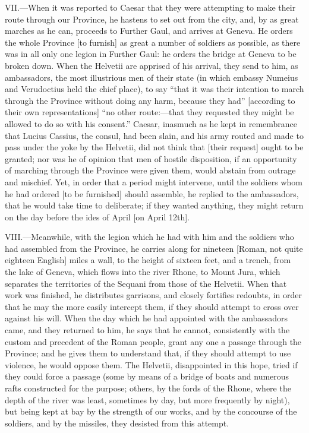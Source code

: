 VII.—When it was reported to Caesar that they were attempting to make
their route through our Province, he hastens to set out from the city,
and, by as great marches as he can, proceeds to Further Gaul, and
arrives at Geneva. He orders the whole Province [to furnish] as great a
number of soldiers as possible, as there was in all only one legion in
Further Gaul: he orders the bridge at Geneva to be broken down. When the
Helvetii are apprised of his arrival, they send to him, as ambassadors,
the most illustrious men of their state (in which embassy Numeius and
Verudoctius held the chief place), to say ``that it was their intention
to march through the Province without doing any harm, because they had''
[according to their own representations] ``no other route:—that they
requested they might be allowed to do so with his consent.'' Caesar,
inasmuch as he kept in remembrance that Lucius Cassius, the consul, had
been slain, and his army routed and made to pass under the yoke by the
Helvetii, did not think that [their request] ought to be granted; nor
was he of opinion that men of hostile disposition, if an opportunity of
marching through the Province were given them, would abstain from
outrage and mischief. Yet, in order that a period might intervene, until
the soldiers whom he had ordered [to be furnished] should assemble, he
replied to the ambassadors, that he would take time to deliberate; if
they wanted anything, they might return on the day before the ides of
April [on April 12th].

VIII.—Meanwhile, with the legion which he had with him and the soldiers
who had assembled from the Province, he carries along for nineteen
[Roman, not quite eighteen English] miles a wall, to the height of
sixteen feet, and a trench, from the lake of Geneva, which flows into
the river Rhone, to Mount Jura, which separates the territories of the
Sequani from those of the Helvetii. When that work was finished, he
distributes garrisons, and closely fortifies redoubts, in order that he
may the more easily intercept them, if they should attempt to cross over
against his will. When the day which he had appointed with the
ambassadors came, and they returned to him, he says that he cannot,
consistently with the custom and precedent of the Roman people, grant
any one a passage through the Province; and he gives them to understand
that, if they should attempt to use violence, he would oppose them. The
Helvetii, disappointed in this hope, tried if they could force a passage
(some by means of a bridge of boats and numerous rafts constructed for
the purpose; others, by the fords of the Rhone, where the depth of the
river was least, sometimes by day, but more frequently by night), but
being kept at bay by the strength of our works, and by the concourse of
the soldiers, and by the missiles, they desisted from this attempt.

